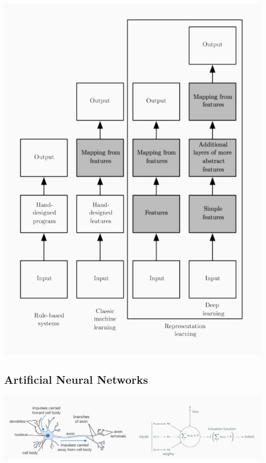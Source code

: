 \documentclass[10pt]{report}
\begin{document}
\begin{center}
\includegraphics[scale=0.35]{./pics/cnn/representation-learning.jpg}
\end{center}

\subsection{Artificial Neural Networks}
\label{sec:org6f787af}
\begin{center}
\includegraphics[width=.9\linewidth]{./pics/cnn/neurons.jpg}
\end{center}
\end{document}
